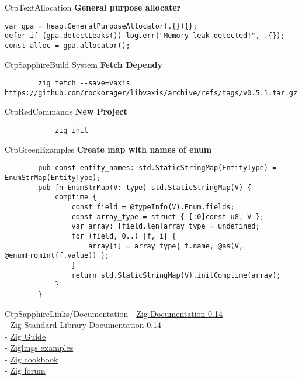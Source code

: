 \documentclass[10pt,a4paper]{article}
\begin{document}
\begin{multicols*}{3}
\begin{mycolorbox}{CtpText}{Allocation}
		\textbf{General purpose allocater}
	\begin{verbatim}
var gpa = heap.GeneralPurposeAllocator(.{}){};
defer if (gpa.detectLeaks()) log.err("Memory leak detected!", .{});
const alloc = gpa.allocator();
	\end{verbatim}
\end{mycolorbox}


\begin{mycolorbox}{CtpSapphire}{Build System}
	\textbf{Fetch Dependy}
	\begin{verbatim}
		zig fetch --save=vaxis https://github.com/rockorager/libvaxis/archive/refs/tags/v0.5.1.tar.gz
	\end{verbatim}
\end{mycolorbox}

\begin{mycolorbox}{CtpRed}{Commands}
		\textbf{New Project}
		\begin{verbatim}
			zig init
		\end{verbatim}
\end{mycolorbox}

\end{multicols*}	
\newpage
\begin{mycolorbox}{CtpGreen}{Examples}
	\textbf{Create map with names of enum}
	\begin{verbatim}
		pub const entity_names: std.StaticStringMap(EntityType) = EnumStrMap(EntityType);
		pub fn EnumStrMap(V: type) std.StaticStringMap(V) {
			comptime {
				const field = @typeInfo(V).Enum.fields;
				const array_type = struct { [:0]const u8, V };
				var array: [field.len]array_type = undefined;
				for (field, 0..) |f, i| {
					array[i] = array_type{ f.name, @as(V, @enumFromInt(f.value)) };
				}
				return std.StaticStringMap(V).initComptime(array);
			}
		}
	\end{verbatim}
\end{mycolorbox}

\begin{mycolorbox}{CtpSapphire}{Links/Documentation}
	- \href{https://ziglang.org/documentation/0.14.0/}{Zig Documentation 0.14}\\
	- \href{https://ziglang.org/documentation/0.14.0/std/}{Zig Standard Library Documentation 0.14}\\
	- \href{https://zig.guide/}{Zig Guide}\\
	- \href{https://codeberg.org/ziglings/exercises/#ziglings}{Ziglings examples}\\
	- \href{https://cookbook.ziglang.cc/}{Zig cookbook}\\
	- \href{https://ziggit.dev/}{Zig forum}\\
\end{mycolorbox}
	
\end{document}
